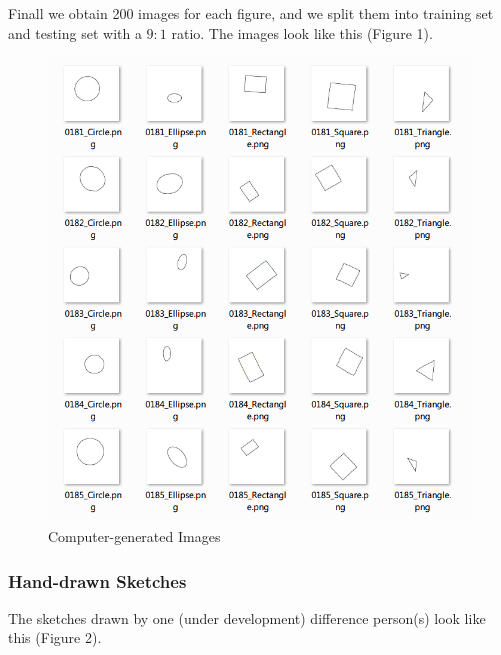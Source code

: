 Finall we obtain 200 images for each figure, and we split them into training set and testing set with a $9:1$ ratio.  The images look like this (Figure 1).

\begin{figure}[ht!]
\includegraphics[width=\columnwidth]{Figure_1_CG_Image.png}
\caption{Computer-generated Images}
\end{figure}

\subsubsection{Hand-drawn Sketches}

The sketches drawn by one (under development) difference person(s) look like this (Figure 2).

